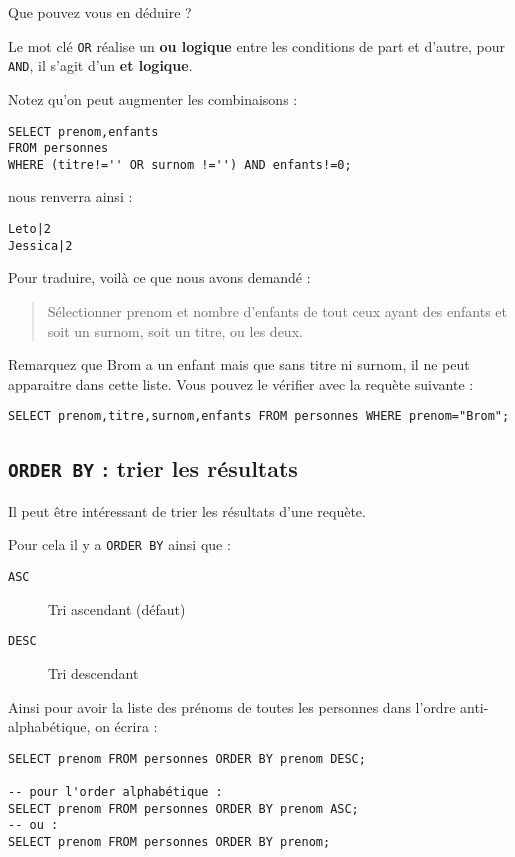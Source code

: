 \documentclass[a4paper, 11pt]{report}
\begin{document}
Que pouvez vous en déduire ?

Le mot clé \texttt{OR} réalise un {\bfseries ou logique} entre les conditions de part et d'autre, pour \texttt{AND}, il s'agit d'un {\bfseries et logique}.

Notez qu'on peut augmenter les combinaisons :

\begin{verbatim}
SELECT prenom,enfants
FROM personnes
WHERE (titre!='' OR surnom !='') AND enfants!=0;
\end{verbatim}

nous renverra ainsi :

\begin{verbatim}
Leto|2
Jessica|2
\end{verbatim}

Pour traduire, voilà ce que nous avons demandé :

\begin{quote}
Sélectionner prenom et nombre d'enfants de tout ceux ayant des enfants et soit un surnom, soit un titre, ou les deux.
\end{quote}

Remarquez que Brom a un enfant mais que sans titre ni surnom, il ne peut apparaitre dans cette liste.
Vous pouvez le vérifier avec la requète suivante :

\begin{verbatim}
SELECT prenom,titre,surnom,enfants FROM personnes WHERE prenom="Brom";
\end{verbatim}

\subsection{\texttt{ORDER BY} : trier les résultats}

Il peut être intéressant de trier les résultats d'une requète.

Pour cela il y a \texttt{ORDER BY} ainsi que :

\begin{description}
    \item[\texttt{ASC}] Tri ascendant (défaut)
    \item[\texttt{DESC}] Tri descendant
\end{description}

Ainsi pour avoir la liste des prénoms de toutes les personnes dans l'ordre anti-alphabétique, on écrira :

\begin{verbatim}
SELECT prenom FROM personnes ORDER BY prenom DESC;

-- pour l'order alphabétique :
SELECT prenom FROM personnes ORDER BY prenom ASC;
-- ou :
SELECT prenom FROM personnes ORDER BY prenom;
\end{verbatim}
\end{document}
